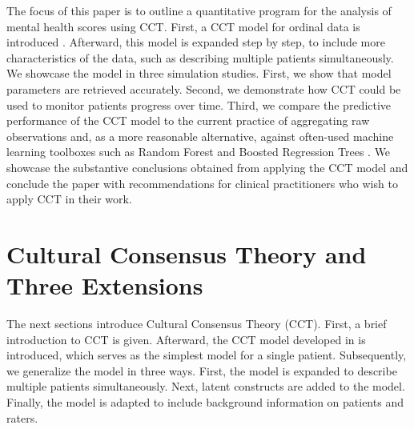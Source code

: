 \documentclass[a4paper]{article}
\newcommand{\AB}{AB}
\begin{document}
The focus of this paper is to outline a quantitative program for the analysis of mental health scores using CCT. First, a CCT model for ordinal data is introduced \cite{Anders2015cultural}. Afterward, this model is expanded step by step, to include more characteristics of the data, such as describing multiple patients simultaneously. We showcase the model in three simulation studies. First, we show that model parameters are retrieved accurately. Second, we demonstrate how CCT could be used to monitor patients progress over time. Third, we compare the predictive performance of the CCT model to the current practice of aggregating raw observations and, as a more reasonable alternative, against often-used machine learning toolboxes such as Random Forest \cite{breiman2001random} and Boosted Regression Trees \cite{friedman2002stochastic}. We showcase the substantive conclusions obtained from applying the CCT model and conclude the paper with recommendations for clinical practitioners who wish to apply CCT in their work.

\section*{Cultural Consensus Theory and Three Extensions}
The next sections introduce Cultural Consensus Theory (CCT). First, a brief introduction to CCT is given. Afterward, the CCT model developed in \citeA[henceforth \AB{}]{Anders2015cultural} is introduced, which serves as the simplest model for a single patient. Subsequently, we generalize the model in three ways. First, the model is expanded to describe multiple patients simultaneously. Next, latent constructs are added to the model. Finally, the model is adapted to include background information on patients and raters.
\end{document}
